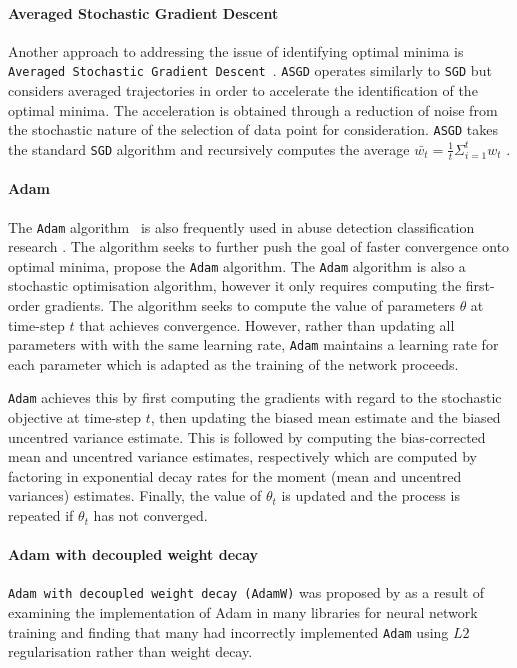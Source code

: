 \paragraph{Averaged Stochastic Gradient Descent}
Another approach to addressing the issue of identifying optimal minima is \texttt{Averaged Stochastic Gradient Descent}~\citet{Polyak:1992}. \texttt{ASGD} operates similarly to \texttt{SGD} but considers averaged trajectories in order to accelerate the identification of the optimal minima. The acceleration is obtained through a reduction of noise from the stochastic nature of the selection of data point for consideration. \texttt{ASGD} takes the standard \texttt{SGD} algorithm and recursively computes the average $\bar{w_t} = \tfrac{1}{t}\Sigma_{i=1}^t w_t$ \citep{Bottou:2010}.

\paragraph{Adam}
The \texttt{Adam} algorithm~\citep{Kingma:2014} is also frequently used in abuse detection classification research \citep{Meyer:2019,Zimmerman:2018,Kolhatkar:2021}.
The algorithm seeks to further push the goal of faster convergence onto optimal minima, \citet{Kingma:2014} propose the \texttt{Adam} algorithm.
The \texttt{Adam} algorithm is also a stochastic optimisation algorithm, however it only requires computing the first-order gradients.
The algorithm seeks to compute the value of parameters $\theta$ at time-step $t$ that achieves convergence.
However, rather than updating all parameters with with the same learning rate, \texttt{Adam} maintains a learning rate for each parameter which is adapted as the training of the network proceeds.

\texttt{Adam} achieves this by first computing the gradients with regard to the stochastic objective at time-step $t$, then updating the biased mean estimate and the biased uncentred variance estimate.
This is followed by computing the bias-corrected mean and uncentred variance estimates, respectively which are computed by factoring in exponential decay rates for the moment (mean and uncentred variances) estimates.
Finally, the value of $\theta_t$ is updated and the process is repeated if $\theta_t$ has not converged.

\paragraph{Adam with decoupled weight decay} \texttt{Adam with decoupled weight decay (AdamW)} was proposed by \citet{Loshchilov:2019} as a result of examining the implementation of Adam in many libraries for neural network training and finding that many had incorrectly implemented \texttt{Adam} using $L2$ regularisation rather than weight decay.

